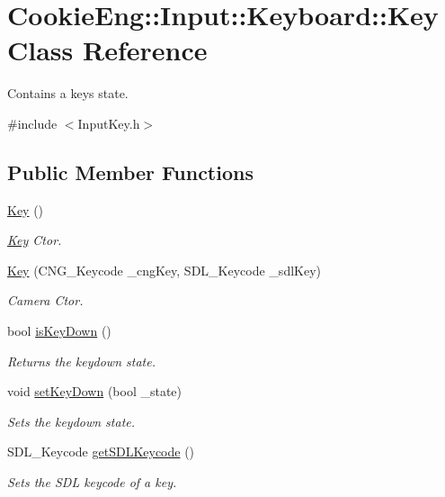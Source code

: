 \hypertarget{class_cookie_eng_1_1_input_1_1_keyboard_1_1_key}{}\section{Cookie\+Eng\+:\+:Input\+:\+:Keyboard\+:\+:Key Class Reference}
\label{class_cookie_eng_1_1_input_1_1_keyboard_1_1_key}


Contains a key\textquotesingle{}s state.  




{\ttfamily \#include $<$Input\+Key.\+h$>$}

\subsection*{Public Member Functions}
\begin{DoxyCompactItemize}
\item 
\hyperlink{class_cookie_eng_1_1_input_1_1_keyboard_1_1_key_a263217e998b290d7e740ded3a76e06de}{Key} ()
\begin{DoxyCompactList}\small\item\em \hyperlink{class_cookie_eng_1_1_input_1_1_keyboard_1_1_key}{Key} Ctor. \end{DoxyCompactList}\item 
\hyperlink{class_cookie_eng_1_1_input_1_1_keyboard_1_1_key_a61db9dd062b7fc6a38f1a4828a9a4222}{Key} (C\+N\+G\+\_\+\+Keycode \+\_\+cng\+Key, S\+D\+L\+\_\+\+Keycode \+\_\+sdl\+Key)
\begin{DoxyCompactList}\small\item\em Camera Ctor. \end{DoxyCompactList}\item 
bool \hyperlink{class_cookie_eng_1_1_input_1_1_keyboard_1_1_key_a2c0499cd43fea6c114114e176f5243ac}{is\+Key\+Down} ()
\begin{DoxyCompactList}\small\item\em Returns the keydown state. \end{DoxyCompactList}\item 
void \hyperlink{class_cookie_eng_1_1_input_1_1_keyboard_1_1_key_a27ba9abbd1fce1b29dff7e2cbb418223}{set\+Key\+Down} (bool \+\_\+state)
\begin{DoxyCompactList}\small\item\em Sets the keydown state. \end{DoxyCompactList}\item 
S\+D\+L\+\_\+\+Keycode \hyperlink{class_cookie_eng_1_1_input_1_1_keyboard_1_1_key_a61f34621eeb4872f9a8cd4bb8fc025d6}{get\+S\+D\+L\+Keycode} ()
\begin{DoxyCompactList}\small\item\em Sets the S\+DL keycode of a key. \end{DoxyCompactList}\end{DoxyCompactItemize}
